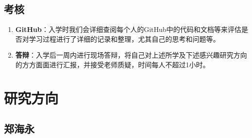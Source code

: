 \documentclass[14pt,a4paper]{extarticle}
\begin{document}
\subsection{考核}

\begin{enumerate}
\item \textbf{GitHub}：入学时我们会详细查阅每个人的GitHub中的代码和文档等来评估是否对学习过程进行了详细的记录和整理，尤其自己的思考和问题等。
\item \textbf{答辩}：入学后一周内进行现场答辩，将自己对上述所学及下述感兴趣研究方向的方方面面进行汇报，并接受老师质疑，时间每人不超过1小时。
\end{enumerate}

\section{研究方向}

\subsection{郑海永}
\end{document}
